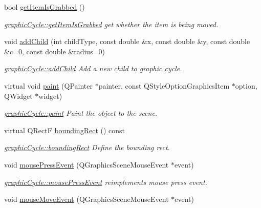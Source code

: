 \begin{DoxyCompactItemize}
bool \mbox{\hyperlink{classgraphic_cycle_a10e61352945ca9b32b83e528e2fc6853}{get\+Item\+Is\+Grabbed}} ()
\begin{DoxyCompactList}\small\item\em \mbox{\hyperlink{classgraphic_cycle_a10e61352945ca9b32b83e528e2fc6853}{graphic\+Cycle\+::get\+Item\+Is\+Grabbed}} get whether the item is being moved. \end{DoxyCompactList}\item 
void \mbox{\hyperlink{classgraphic_cycle_a44dc93e5f66707fd102c2acccbef076c}{add\+Child}} (int child\+Type, const double \&x, const double \&y, const double \&c=0, const double \&radius=0)
\begin{DoxyCompactList}\small\item\em \mbox{\hyperlink{classgraphic_cycle_a44dc93e5f66707fd102c2acccbef076c}{graphic\+Cycle\+::add\+Child}} Add a new child to graphic cycle. \end{DoxyCompactList}\item 
virtual void \mbox{\hyperlink{classgraphic_cycle_a746393c5d92838147094dadee5c289f5}{paint}} (Q\+Painter $\ast$painter, const Q\+Style\+Option\+Graphics\+Item $\ast$option, Q\+Widget $\ast$widget)
\begin{DoxyCompactList}\small\item\em \mbox{\hyperlink{classgraphic_cycle_a746393c5d92838147094dadee5c289f5}{graphic\+Cycle\+::paint}} Paint the object to the scene. \end{DoxyCompactList}\item 
virtual Q\+RectF \mbox{\hyperlink{classgraphic_cycle_a4db310e0fdbccffefc7404c47eb73607}{bounding\+Rect}} () const
\begin{DoxyCompactList}\small\item\em \mbox{\hyperlink{classgraphic_cycle_a4db310e0fdbccffefc7404c47eb73607}{graphic\+Cycle\+::bounding\+Rect}} Define the bounding rect. \end{DoxyCompactList}\item 
void \mbox{\hyperlink{classgraphic_cycle_af731c349d665b784291187ad4b0a71d9}{mouse\+Press\+Event}} (Q\+Graphics\+Scene\+Mouse\+Event $\ast$event)
\begin{DoxyCompactList}\small\item\em \mbox{\hyperlink{classgraphic_cycle_af731c349d665b784291187ad4b0a71d9}{graphic\+Cycle\+::mouse\+Press\+Event}} reimplements mouse press event. \end{DoxyCompactList}\item 
void \mbox{\hyperlink{classgraphic_cycle_aec6514c9578de68150bf2eea9b4e80c4}{mouse\+Move\+Event}} (Q\+Graphics\+Scene\+Mouse\+Event $\ast$event)

\end{DoxyCompactItemize}
